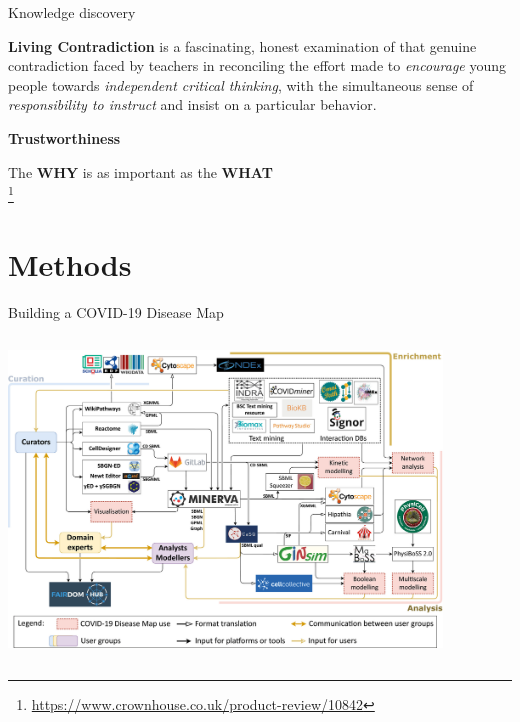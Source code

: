 \documentclass[compress,ignorenonframetext,aspectratio=1610,handout]{beamer}
\newcommand\blfootnote[1]{%
  \begingroup
  \renewcommand\thefootnote{}\footnote{\tiny{#1}}%
  \addtocounter{footnote}{-1}%
  \endgroup
}
\begin{document}
\begin{frame}{Knowledge discovery}

	\textbf{Living Contradiction} is a fascinating, honest examination of that genuine contradiction faced 
	by teachers in reconciling the effort made to \emph{encourage} young people towards \emph{independent 
	critical thinking}, with the simultaneous sense of \emph{responsibility to instruct} and insist 
	on a particular behavior. \\

	\vspace*{1em}

	\textbf{Trustworthiness} \\

	\vspace*{1em}

	The \textbf{WHY} is as important as the \textbf{WHAT} \\

	\blfootnote{\url{https://www.crownhouse.co.uk/product-review/10842}}

\end{frame}

\section{Methods}


\begin{frame}{Building a COVID-19 Disease Map}
	\begin{columns}
		\begin{column}{0.6\textwidth}
			\centering
			\includegraphics[width=0.9\textwidth]{figs/methods/covid19-diseasemap-consrtium.jpg}

		\end{column}

		\pause

		\begin{column}{0.4\textwidth}

		\end{column}

	\end{columns}

\end{frame}
\end{document}
